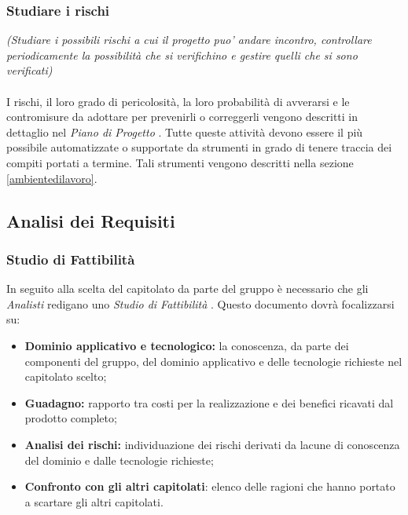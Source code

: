 \subsubsection{Studiare i rischi}
\textit{(Studiare i possibili rischi a cui il progetto puo' andare incontro, controllare periodicamente la possibilità che si verifichino e gestire quelli che si sono verificati)}\\ \\
I rischi, il loro grado di pericolosità, la loro probabilità di avverarsi e le contromisure da adottare per prevenirli o correggerli vengono descritti in dettaglio nel \textit{Piano di Progetto} .
Tutte queste attività devono essere il più possibile automatizzate o supportate da strumenti in grado di tenere traccia dei compiti portati a termine. Tali strumenti vengono descritti nella sezione \ref{ambientedilavoro}.


\subsection{Analisi dei Requisiti}
\subsubsection{Studio di Fattibilità}
In seguito alla scelta del capitolato da parte del gruppo è necessario che gli \textit{Analisti} redigano uno \textit{Studio di Fattibilità} . Questo documento dovrà focalizzarsi su:
\begin{itemize}
\item \textbf{Dominio applicativo e tecnologico:} la conoscenza, da parte dei componenti del gruppo, del dominio applicativo e delle tecnologie richieste nel capitolato scelto; 
\item \textbf{Guadagno:} rapporto tra costi per la realizzazione e dei benefici ricavati dal prodotto completo;
\item \textbf{Analisi dei rischi:} individuazione dei rischi derivati da lacune di conoscenza del dominio e dalle tecnologie richieste;
\item \textbf{Confronto con gli altri capitolati}: elenco delle ragioni che hanno portato a scartare gli altri capitolati.
\end{itemize}
